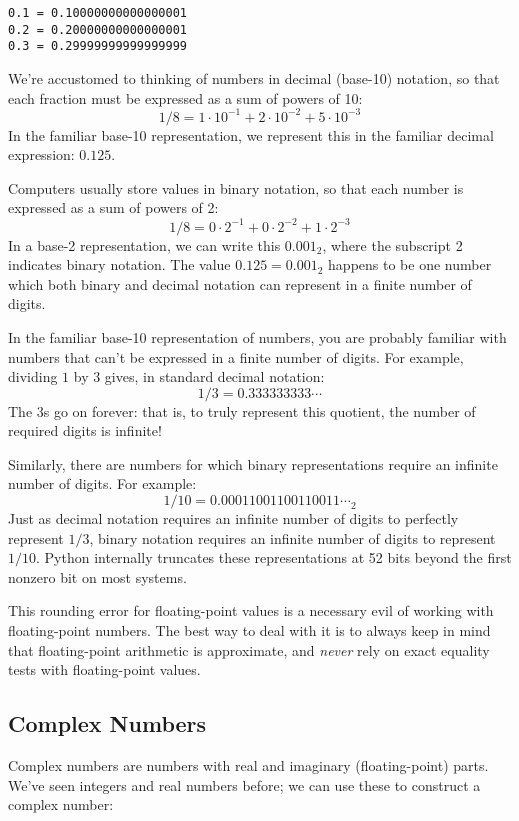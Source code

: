 \documentclass[11pt]{article}
\begin{document}
    \begin{Verbatim}[commandchars=\\\{\}]
0.1 = 0.10000000000000001
0.2 = 0.20000000000000001
0.3 = 0.29999999999999999

    \end{Verbatim}

    We're accustomed to thinking of numbers in decimal (base-10) notation,
so that each fraction must be expressed as a sum of powers of 10: \[
1 /8 = 1\cdot 10^{-1} + 2\cdot 10^{-2} + 5\cdot 10^{-3}
\] In the familiar base-10 representation, we represent this in the
familiar decimal expression: \(0.125\).

Computers usually store values in binary notation, so that each number
is expressed as a sum of powers of 2: \[
1/8 = 0\cdot 2^{-1} + 0\cdot 2^{-2} + 1\cdot 2^{-3}
\] In a base-2 representation, we can write this \(0.001_2\), where the
subscript 2 indicates binary notation. The value \(0.125 = 0.001_2\)
happens to be one number which both binary and decimal notation can
represent in a finite number of digits.

In the familiar base-10 representation of numbers, you are probably
familiar with numbers that can't be expressed in a finite number of
digits. For example, dividing \(1\) by \(3\) gives, in standard decimal
notation: \[
1 / 3 = 0.333333333\cdots
\] The 3s go on forever: that is, to truly represent this quotient, the
number of required digits is infinite!

Similarly, there are numbers for which binary representations require an
infinite number of digits. For example: \[
1 / 10 = 0.00011001100110011\cdots_2
\] Just as decimal notation requires an infinite number of digits to
perfectly represent \(1/3\), binary notation requires an infinite number
of digits to represent \(1/10\). Python internally truncates these
representations at 52 bits beyond the first nonzero bit on most systems.

This rounding error for floating-point values is a necessary evil of
working with floating-point numbers. The best way to deal with it is to
always keep in mind that floating-point arithmetic is approximate, and
\emph{never} rely on exact equality tests with floating-point values.

    \subsection{Complex Numbers}\label{complex-numbers}

Complex numbers are numbers with real and imaginary (floating-point)
parts. We've seen integers and real numbers before; we can use these to
construct a complex number:
\end{document}
